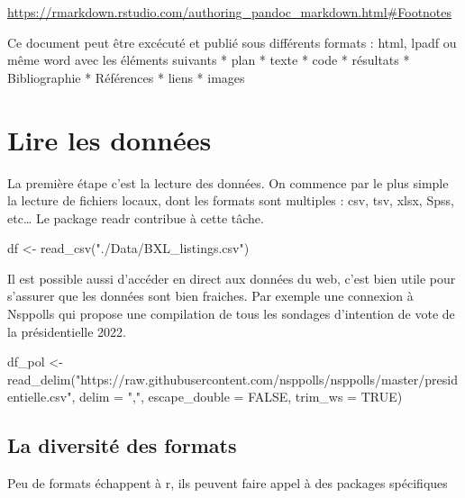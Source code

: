 \documentclass[
]{book}
\newenvironment{Shaded}{\begin{snugshade}}{\end{snugshade}}
\newcommand{\AttributeTok}[1]{\textcolor[rgb]{0.77,0.63,0.00}{#1}}
\newcommand{\ConstantTok}[1]{\textcolor[rgb]{0.00,0.00,0.00}{#1}}
\newcommand{\FunctionTok}[1]{\textcolor[rgb]{0.00,0.00,0.00}{#1}}
\newcommand{\NormalTok}[1]{#1}
\newcommand{\OtherTok}[1]{\textcolor[rgb]{0.56,0.35,0.01}{#1}}
\newcommand{\StringTok}[1]{\textcolor[rgb]{0.31,0.60,0.02}{#1}}
\begin{document}
\url{https://rmarkdown.rstudio.com/authoring_pandoc_markdown.html\#Footnotes}

Ce document peut être excécuté et publié sous différents formats : html, lpadf ou même word avec les éléments suivants
* plan
* texte
* code
* résultats
* Bibliographie
* Références
* liens
* images

\hypertarget{lire-les-donnuxe9es}{%
\section{Lire les données}\label{lire-les-donnuxe9es}}

La première étape c'est la lecture des données. On commence par le plus simple la lecture de fichiers locaux, dont les formats sont multiples : csv, tsv, xlsx, Spss, etc\ldots{} Le package readr contribue à cette tâche.

\begin{Shaded}
\begin{Highlighting}[]
\NormalTok{df }\OtherTok{\textless{}{-}} \FunctionTok{read\_csv}\NormalTok{(}\StringTok{"./Data/BXL\_listings.csv"}\NormalTok{)}
\end{Highlighting}
\end{Shaded}

Il est possible aussi d'accéder en direct aux données du web, c'est bien utile pour s'assurer que les données sont bien fraiches. Par exemple une connexion à Nsppolls qui propose une compilation de tous les sondages d'intention de vote de la présidentielle 2022.

\begin{Shaded}
\begin{Highlighting}[]
\NormalTok{df\_pol }\OtherTok{\textless{}{-}} \FunctionTok{read\_delim}\NormalTok{(}\StringTok{"https://raw.githubusercontent.com/nsppolls/nsppolls/master/presidentielle.csv"}\NormalTok{, }
                     \AttributeTok{delim =} \StringTok{","}\NormalTok{, }\AttributeTok{escape\_double =} \ConstantTok{FALSE}\NormalTok{, }\AttributeTok{trim\_ws =} \ConstantTok{TRUE}\NormalTok{)}
\end{Highlighting}
\end{Shaded}

\hypertarget{la-diversituxe9-des-formats}{%
\subsection{La diversité des formats}\label{la-diversituxe9-des-formats}}

Peu de formats échappent à r, ils peuvent faire appel à des packages spécifiques
\end{document}
